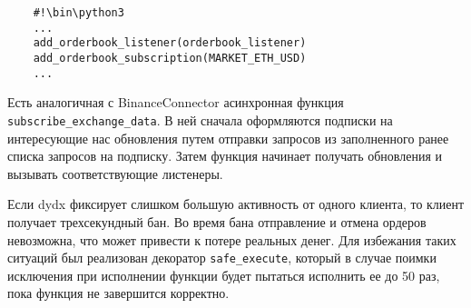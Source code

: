 \begin{verbatim}
    #!\bin\python3
    ...
    add_orderbook_listener(orderbook_listener)
    add_orderbook_subscription(MARKET_ETH_USD)
    ...
\end{verbatim}

Есть аналогичная с BinanceConnector асинхронная функция \texttt{subscribe\_exchange\_data}. В ней сначала оформляются подписки на интересующие нас обновления путем отправки запросов из заполненного ранее списка запросов на подписку. Затем функция начинает получать обновления и вызывать соответствующие листенеры.

Если dydx фиксирует слишком большую активность от одного клиента, то клиент получает трехсекундный бан. Во время бана отправление и отмена ордеров невозможна, что может привести к потере реальных денег. Для избежания таких ситуаций был реализован декоратор \texttt{safe\_execute}, который в случае поимки исключения при исполнении функции будет пытаться исполнить ее до 50 раз, пока функция не завершится корректно.



